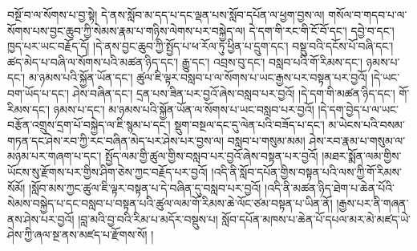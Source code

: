 བསྔོ་བ་ལ་སོགས་པ་བྱ་སྟེ། དེ་ནས་སློབ་མ་དད་པ་དང་ལྡན་པས་སློབ་དཔོན་ལ་ཕྱག་བྱས་ལ། གསོལ་བ་གདབ་པ་ལ་སོགས་པས་བྱང་ཆུབ་ཀྱི་སེམས་རྣམ་པ་གཉིས་ལེགས་པར་བསྐྱེད་ལ། དེ་དག་གི་རང་གི་ངོ་བོ་དང་། དབྱེ་བ་དང་། ཁྱད་པར་ཡང་བརྗོད་དོ། །དེ་ནས་བྱང་ཆུབ་ཀྱི་སྤྱོད་པ་ཕ་རོལ་ཏུ་ཕྱིན་པ་དྲུག་དང་། བསྡུ་བའི་དངོས་པོ་བཞི་དང་། ཚད་མེད་པ་བཞི་ལ་སོགས་པའི་མཚན་ཉིད་དང་། རྒྱུ་དང་། འབྲས་བུ་དང་། བསླབ་པའི་གོ་རིམས་དང་། ཉམས་པ་དང་། མ་ཉམས་པའི་སྐྱོན་ཡོན་དང་། ཚུལ་ཇི་ལྟར་བསླབ་པ་ལ་སོགས་པ་ཡང་རྒྱས་པར་བསྟན་པར་བྱའོ། །དེ་ཡང་བག་ཡོད་པ་དང་། ཤེས་བཞིན་དང་། དྲན་པས་ཟིན་པར་བྱའོ་ཞེས་བསླབ་པར་བྱའོ། །དེ་དག་གི་མཚན་ཉིད་དང་། གོ་རིམས་དང་། ཉམས་པ་དང་། མ་ཉམས་པའི་སྐྱོན་ཡོན་ལ་སོགས་པ་ཡང་བསླབ་པར་བྱའོ། །དེ་དག་བྱེད་པ་ལ་ཡང་བརྩོན་འགྲུས་དྲག་པོ་བསྐྱེད་ལ་ཇི་སྙམ་པ་དང་། སྡུག་བསྔལ་དང་དུ་ལེན་པའི་བཟོད་པ་དང་། མ་ཡེངས་པའི་བསམ་གཏན་དང་ཤེས་རབ་ཀྱི་རང་བཞིན་མེད་པར་ཤེས་པར་བྱས་ལ། བསླབ་པ་གསུམ་མམ། ཤེས་རབ་རྣམ་པ་གསུམ་ལ་མཉམ་པར་གཞག་པ་དང་། སྤྱོད་ལམ་གྱི་ཚུལ་གྱིས་བསླབ་པར་བྱའོ་ཞེས་བསྟན་པར་བྱའོ། །མཐར་སྨོན་ལམ་གྱིས་ཡོངས་སུ་རྫོགས་པར་གྱིས་ཤིག་ཅེས་ཀྱང་བརྗོད་པར་བྱའོ། །འདི་ནི་སློབ་དཔོན་གྱིས་བསྟན་པའི་ལས་ཀྱི་གོ་རིམས་སོམོ། །སློབ་མས་ཀྱང་ཚུལ་ཇི་ལྟར་བསྟན་པ་དེ་བཞིན་དུ་བསླབ་པར་བྱའོ། །འདི་ནི་མཚན་ཉིད་ཐེག་པ་ཆེན་པོའི་སེམས་བསྐྱེད་པ་དང་བསླབ་པ་བསྟན་པའི་ཚུལ་ལམ་གོ་རིམས་ཆེ་ལོང་ཙམ་བསྟན་པ་ཡིན་ནོ། །རྒྱས་པར་ནི་གཞན་ནས་ཤེས་པར་བྱའོ། །བླ་མའི་བྱ་བའི་རིམ་པ་མདོར་བསྡུས་པ། སློབ་དཔོན་མཁས་པ་ཆེན་པོ་དཔལ་མར་མེ་མཛད་ཡེ་ཤེས་ཀྱི་ཞལ་སྔ་ནས་མཛད་པ་རྫོགས་སོ། ། 